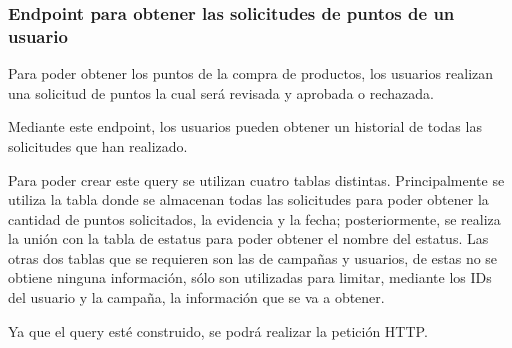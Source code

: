 \subsubsection{Endpoint para obtener las solicitudes de puntos de un usuario}
Para poder obtener los puntos de la compra de productos, los usuarios realizan una solicitud de puntos la cual será revisada y aprobada o rechazada.

Mediante este endpoint, los usuarios pueden obtener un historial de todas las solicitudes que han realizado.

Para poder crear este query se utilizan cuatro tablas distintas. Principalmente se utiliza la tabla donde se almacenan todas las solicitudes para poder obtener la cantidad de puntos solicitados, la evidencia y la fecha; posteriormente, se realiza la unión con la tabla de estatus para poder obtener el nombre del estatus. Las otras dos tablas que se requieren son las de campañas y usuarios, de estas no se obtiene ninguna información, sólo son utilizadas para limitar, mediante los IDs del usuario y la campaña, la información que se va a obtener.

Ya que el query esté construido, se podrá realizar la petición HTTP.